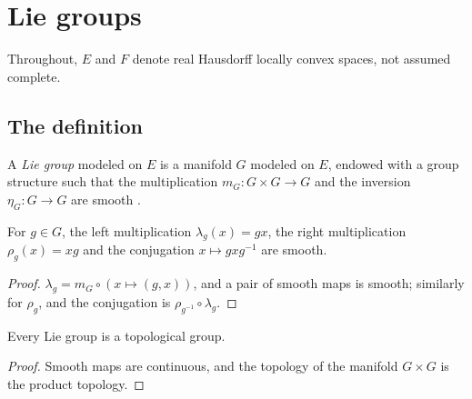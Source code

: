 \chapter{Lie groups}
\label{chap:liegroups}

Throughout, $E$ and $F$ denote real Hausdorff locally convex spaces, not assumed complete.

\section{The definition}

\begin{definition}
  \label{def:lie-group}
  \leanok
  A \emph{Lie group} modeled on $E$ is a manifold $G$ modeled on $E$, endowed with a group
  structure such that the multiplication $m_G\colon G \times G \to G$ and the inversion
  $\eta_G\colon G \to G$ are smooth \cite[Definition 5.1.1(b)]{GN26}.
\end{definition}

\begin{proposition}
  \label{prop:translations}
  \leanok
  For $g \in G$, the left multiplication $\lambda_g(x) = gx$, the right multiplication
  $\rho_g(x) = xg$ and the conjugation $x \mapsto gxg^{-1}$ are smooth.
\end{proposition}

\begin{proof}
  \leanok
  $\lambda_g = m_G \circ (x \mapsto (g, x))$, and a pair of smooth maps is smooth; similarly for
  $\rho_g$, and the conjugation is $\rho_{g^{-1}} \circ \lambda_g$.
\end{proof}

\begin{proposition}
  \label{prop:topological-group}
  \leanok
  Every Lie group is a topological group.
\end{proposition}

\begin{proof}
  \leanok
  Smooth maps are continuous, and the topology of the manifold $G \times G$ is the product
  topology.
\end{proof}

